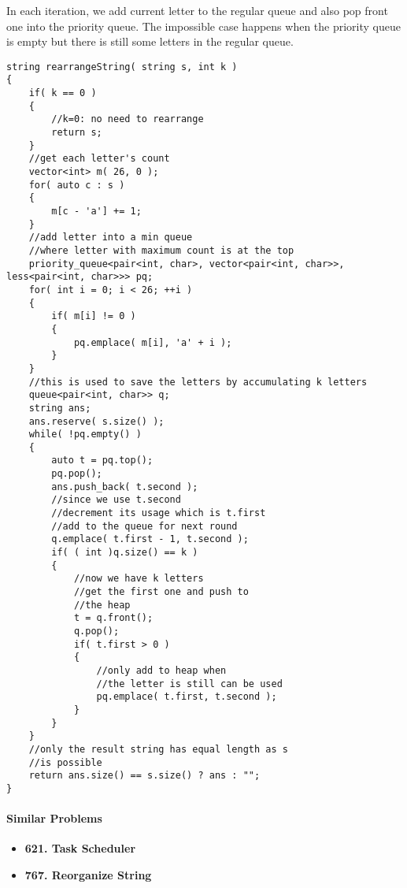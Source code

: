 In each iteration, we add current letter to the regular queue and also pop front one into the priority queue. The impossible case happens when the priority queue is empty but there is still some letters in the regular queue.

\setcounter{lstlisting}{0}
\begin{lstlisting}[style=customc, caption={Greedy}]
string rearrangeString( string s, int k )
{
    if( k == 0 )
    {
        //k=0: no need to rearrange
        return s;
    }
    //get each letter's count
    vector<int> m( 26, 0 );
    for( auto c : s )
    {
        m[c - 'a'] += 1;
    }
    //add letter into a min queue
    //where letter with maximum count is at the top
    priority_queue<pair<int, char>, vector<pair<int, char>>, less<pair<int, char>>> pq;
    for( int i = 0; i < 26; ++i )
    {
        if( m[i] != 0 )
        {
            pq.emplace( m[i], 'a' + i );
        }
    }
    //this is used to save the letters by accumulating k letters
    queue<pair<int, char>> q;
    string ans;
    ans.reserve( s.size() );
    while( !pq.empty() )
    {
        auto t = pq.top();
        pq.pop();
        ans.push_back( t.second );
        //since we use t.second
        //decrement its usage which is t.first
        //add to the queue for next round
        q.emplace( t.first - 1, t.second );
        if( ( int )q.size() == k )
        {
            //now we have k letters
            //get the first one and push to
            //the heap
            t = q.front();
            q.pop();
            if( t.first > 0 )
            {
                //only add to heap when
                //the letter is still can be used
                pq.emplace( t.first, t.second );
            }
        }
    }
    //only the result string has equal length as s
    //is possible
    return ans.size() == s.size() ? ans : "";
}
\end{lstlisting}

\paragraph{Similar Problems}
\begin{itemize}
\item \textbf{621. Task Scheduler}
\item \textbf{767. Reorganize String}
\end{itemize}